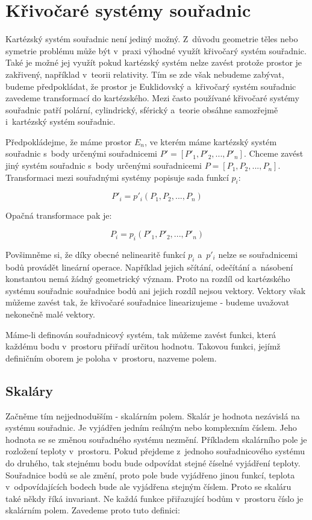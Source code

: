 \section{Křivočaré systémy souřadnic}

Kartézský systém souřadnic není jediný možný. Z~důvodu geometrie těles nebo symetrie problému může být v~praxi výhodné využít křivočarý systém souřadnic. Také je možné jej využít pokud kartézský systém nelze zavést protože prostor je zakřivený, například v~teorii relativity. Tím se zde však nebudeme zabývat, budeme předpokládat, že prostor je Euklidovský a~křivočarý systém souřadnic zavedeme transformací do kartézského. Mezi často používané křivočaré systémy souřadnic patří polární, cylindrický, sférický a~teorie obsáhne samozřejmě i~kartézský systém souřadnic.

Předpokládejme, že máme prostor \(E_n\), ve kterém máme kartézský systém souřadnic s~body určenými souřadnicemi \(P' = [P'_1, P'_2, ..., P'_n]\). Chceme zavést jiný systém souřadnic s~body určenými souřadnicemi \(P = [P_1, P_2, ..., P_n]\). Transformaci mezi souřadnými systémy popisuje sada funkcí \(p_i\):

\begin{equation}
P'_i = p'_i(P_1, P_2, ..., P_n)
\end{equation}

Opačná transformace pak je:

\begin{equation}
P_i = p_i(P'_1, P'_2, ..., P'_n)
\end{equation}

Povšimněme si, že díky obecné nelinearitě funkcí \(p_i\) a~\(p'_i\) nelze se souřadnicemi bodů provádět lineární operace. Například jejich sčítání, odečítání a~násobení konstantou nemá žádný geometrický význam. Proto na rozdíl od kartézského systému souřadnic souřadnice bodů ani jejich rozdíl nejsou vektory. Vektory však můžeme zavést tak, že křivočaré souřadnice linearizujeme - budeme uvažovat nekonečně malé vektory.

Máme-li definován souřadnicový systém, tak můžeme zavést funkci, která každému bodu v~prostoru přiřadí určitou hodnotu. Takovou funkci, jejímž definičním oborem je poloha v~prostoru, nazveme polem. 

\subsection{Skaláry}

Začněme tím nejjednodušším - skalárním polem. Skalár je hodnota nezávislá na systému souřadnic. Je vyjádřen jedním reálným nebo komplexním číslem. Jeho hodnota se se změnou souřadného systému nezmění. Příkladem skalárního pole je rozložení teploty v~prostoru. Pokud přejdeme z~jednoho souřadnicového systému do druhého, tak stejnému bodu bude odpovídat stejné číselné vyjádření teploty. Souřadnice bodů se ale změní, proto pole bude vyjádřeno jinou funkcí, teplota v~odpovídajících bodech bude ale vyjádřena stejným číslem. Proto se skaláru také někdy říká invariant. Ne každá funkce přiřazující bodům v~prostoru číslo je skalárním polem. Zavedeme proto tuto definici:

